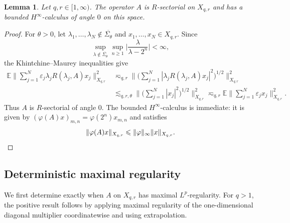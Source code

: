 \documentclass{amsart}
\let\leq\leqslant
\let\geq\geqslant
\theoremstyle{plain}
\theoremstyle{remark}
\theoremstyle{plain}
\newtheorem{lemma}[theorem]{Lemma}
\numberwithin{equation}{section}
\newcommand{\E}{\mathbb E}
\newcommand{\1}{\mathbf 1}
\begin{document}
\begin{lemma}\label{lem:h-infty}
Let $q,r\in [1, \infty)$. The operator $A$ is $R$-sectorial on $X_{q,r}$ and has a bounded
$H^\infty$-calculus of angle $0$ on this space.
\end{lemma}

\begin{proof}
For $\theta>0$, let
$\lambda_1,\ldots,\lambda_N\notin\overline{\Sigma_\theta}$ and
$x_1,\ldots,x_N\in X_{q,r}$. Since
\[
        \sup_{\lambda\notin\overline{\Sigma_\theta}}
        \sup_{n\geq1}
        \Big|\frac{\lambda}{\lambda-2^n}\Big|
        <\infty,
\]
the Khintchine--Maurey inequalities \cite[Theorem 7.2.13]{HNVW2} give
\[
\begin{aligned}
\E\Big\|\sum_{j=1}^N\varepsilon_j\lambda_jR(\lambda_j,A)x_j\Big\|_{X_{q,r}}^2&\eqsim_{q,r}\Big\|\Big(\sum_{j=1}^N|\lambda_jR(\lambda_j,A)x_j|^2\Big)^{1/2}\Big\|_{X_{q,r}}^2\\
&\lesssim_{q,r,\theta}\Big\|\Big(\sum_{j=1}^N|x_j|^2\Big)^{1/2}\Big\|_{X_{q,r}}^2\eqsim_{q,r}\E\Big\|\sum_{j=1}^N\varepsilon_jx_j\Big\|_{X_{q,r}}^2.
\end{aligned}
\]
Thus $A$ is $R$-sectorial of angle $0$. The bounded $H^\infty$-calculus is immediate: it is given by
$(\varphi(A)x)_{m,n} = \varphi(2^n)x_{m,n}$
and satisfies
\[
        \|\varphi(A)x\|_{X_{q,r}} \leq \|\varphi\|_{\infty}\|x\|_{X_{q,r}}.\qedhere
\]
\end{proof}

\subsection{Deterministic maximal regularity}
\label{ss:diagonal-deterministic}

We first determine exactly when $A$ on $X_{q,r}$ has maximal $L^p$-regularity. For $q>1$, the positive result follows by applying maximal regularity of the one-dimensional diagonal multiplier coordinatewise and using extrapolation. 
\end{document}
